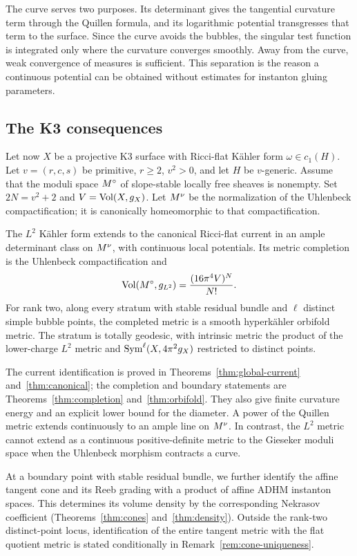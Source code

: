 The curve serves two purposes. Its determinant gives the tangential
curvature term through the Quillen formula, and its logarithmic potential
transgresses that term to the surface. Since the curve avoids the bubbles,
the singular test function is integrated only where the curvature
converges smoothly. Away from the curve, weak convergence of measures is
sufficient. This separation is the reason a continuous potential can be
obtained without estimates for instanton gluing parameters.

\subsection{The K3 consequences}
Let now $X$ be a projective K3 surface with Ricci-flat K\"ahler form
$\omega\in c_1(H)$. Let $v=(r,c,s)$ be primitive, $r\ge2$, $v^2>0$,
and let $H$ be $v$-generic. Assume that the moduli space $M^{\circ}$ of slope-stable
locally free sheaves is nonempty. Set $2N=v^2+2$ and
$V=\operatorname{Vol}(X,g_X)$. Let $M^{\nu}$ be the normalization of the Uhlenbeck
compactification; it is canonically homeomorphic to that compactification.

\begin{theorem}\label{thm:intro-main}
The $L^2$ K\"ahler form extends to the canonical Ricci-flat current in
an ample determinant class on $M^{\nu}$, with continuous local potentials.
Its metric completion is the Uhlenbeck compactification and
\[
 \operatorname{Vol}(M^{\circ},g_{L^2})=\frac{(16\pi^4V)^N}{N!}.
\]
For rank two, along every stratum with stable residual bundle and $\ell$
distinct simple bubble points, the completed metric is a smooth
hyperk\"ahler orbifold metric. The stratum is totally geodesic, with
intrinsic metric the product of the lower-charge $L^2$ metric and
$\operatorname{Sym}^\ell(X,4\pi^2g_X)$ restricted to distinct points.
\end{theorem}

The current identification is proved in
Theorems~\ref{thm:global-current} and~\ref{thm:canonical}; the completion
and boundary statements are Theorems~\ref{thm:completion}
and~\ref{thm:orbifold}. They also give finite curvature energy and an
explicit lower bound for the diameter. A power of the Quillen metric
extends continuously to an ample line on $M^{\nu}$. In contrast, the $L^2$
metric cannot extend as a continuous positive-definite metric to the
Gieseker moduli space when the Uhlenbeck morphism contracts a curve.

At a boundary point with stable residual bundle, we further identify the
affine tangent cone and its Reeb grading with a product of affine ADHM
instanton spaces. This determines its volume density by the corresponding
Nekrasov coefficient (Theorems~\ref{thm:cones} and~\ref{thm:density}).
Outside the rank-two distinct-point locus, identification of the entire
tangent metric with the flat quotient metric is stated conditionally in
Remark~\ref{rem:cone-uniqueness}.

